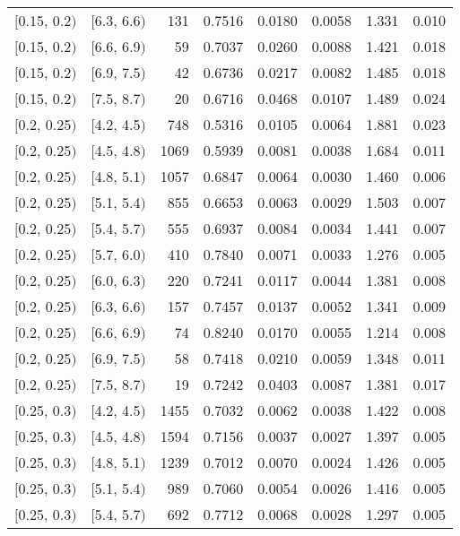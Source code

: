 \begin{longtable}{| l | l | r | r | r | r | r | r |}
        $[$0.15, 0.2$)$ & $[$6.3, 6.6$)$ & 131 & 0.7516 & 0.0180 & 0.0058 & 1.331 & 0.010 \\
        $[$0.15, 0.2$)$ & $[$6.6, 6.9$)$ & 59 & 0.7037 & 0.0260 & 0.0088 & 1.421 & 0.018 \\
        $[$0.15, 0.2$)$ & $[$6.9, 7.5$)$ & 42 & 0.6736 & 0.0217 & 0.0082 & 1.485 & 0.018 \\
        $[$0.15, 0.2$)$ & $[$7.5, 8.7$)$ & 20 & 0.6716 & 0.0468 & 0.0107 & 1.489 & 0.024 \\
        $[$0.2, 0.25$)$ & $[$4.2, 4.5$)$ & 748 & 0.5316 & 0.0105 & 0.0064 & 1.881 & 0.023 \\
        $[$0.2, 0.25$)$ & $[$4.5, 4.8$)$ & 1069 & 0.5939 & 0.0081 & 0.0038 & 1.684 & 0.011 \\
        $[$0.2, 0.25$)$ & $[$4.8, 5.1$)$ & 1057 & 0.6847 & 0.0064 & 0.0030 & 1.460 & 0.006 \\
        $[$0.2, 0.25$)$ & $[$5.1, 5.4$)$ & 855 & 0.6653 & 0.0063 & 0.0029 & 1.503 & 0.007 \\
        $[$0.2, 0.25$)$ & $[$5.4, 5.7$)$ & 555 & 0.6937 & 0.0084 & 0.0034 & 1.441 & 0.007 \\
        $[$0.2, 0.25$)$ & $[$5.7, 6.0$)$ & 410 & 0.7840 & 0.0071 & 0.0033 & 1.276 & 0.005 \\
        $[$0.2, 0.25$)$ & $[$6.0, 6.3$)$ & 220 & 0.7241 & 0.0117 & 0.0044 & 1.381 & 0.008 \\
        $[$0.2, 0.25$)$ & $[$6.3, 6.6$)$ & 157 & 0.7457 & 0.0137 & 0.0052 & 1.341 & 0.009 \\
        $[$0.2, 0.25$)$ & $[$6.6, 6.9$)$ & 74 & 0.8240 & 0.0170 & 0.0055 & 1.214 & 0.008 \\
        $[$0.2, 0.25$)$ & $[$6.9, 7.5$)$ & 58 & 0.7418 & 0.0210 & 0.0059 & 1.348 & 0.011 \\
        $[$0.2, 0.25$)$ & $[$7.5, 8.7$)$ & 19 & 0.7242 & 0.0403 & 0.0087 & 1.381 & 0.017 \\
        $[$0.25, 0.3$)$ & $[$4.2, 4.5$)$ & 1455 & 0.7032 & 0.0062 & 0.0038 & 1.422 & 0.008 \\
        $[$0.25, 0.3$)$ & $[$4.5, 4.8$)$ & 1594 & 0.7156 & 0.0037 & 0.0027 & 1.397 & 0.005 \\
        $[$0.25, 0.3$)$ & $[$4.8, 5.1$)$ & 1239 & 0.7012 & 0.0070 & 0.0024 & 1.426 & 0.005 \\
        $[$0.25, 0.3$)$ & $[$5.1, 5.4$)$ & 989 & 0.7060 & 0.0054 & 0.0026 & 1.416 & 0.005 \\
        $[$0.25, 0.3$)$ & $[$5.4, 5.7$)$ & 692 & 0.7712 & 0.0068 & 0.0028 & 1.297 & 0.005 \\

\end{longtable}
